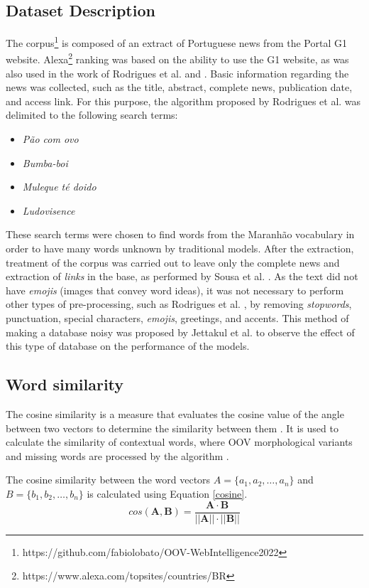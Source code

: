 \documentclass[conference]{IEEEtran}
\begin{document}
\subsection{Dataset Description}
The corpus\footnote[1]{https://github.com/fabiolobato/OOV-WebIntelligence2022} is composed of an extract of Portuguese news from the Portal G1 website. Alexa\footnote[2]{https://www.alexa.com/topsites/countries/BR} ranking was based on the ability to use the G1 website, as was also used in the work of Rodrigues et al. \cite{b11} and \cite{b28}. Basic information regarding the news was collected, such as the title, abstract, complete news, publication date, and access link. For this purpose, the algorithm proposed by Rodrigues et al. \cite{b11} was delimited to the following search terms:
\begin{itemize}
\item \textit{Pão com ovo}
\item \textit{Bumba-boi}
\item \textit{Muleque té doido}
\item \textit{Ludovisence}
\end{itemize}
These search terms were chosen to find words from the Maranhão vocabulary in order to have many words unknown by traditional models. After the extraction, treatment of the corpus was carried out to leave only the complete news and extraction of \textit{links} in the base, as performed by Sousa et al. \cite{b24}. As the text did not have \textit{emojis} (images that convey word ideas), it was not necessary to perform other types of pre-processing, such as Rodrigues et al. \cite{b11}, by removing \textit{stopwords}, punctuation, special characters, \textit{emojis}, greetings, and accents. This method of making a database noisy was proposed by Jettakul et al. \cite{b15} to observe the effect of this type of database on the performance of the models.

\subsection{Word similarity}
The cosine similarity is a measure that evaluates the cosine value of the angle between two vectors to determine the similarity between them \cite{b9}. It is used to calculate the similarity of contextual words, where OOV morphological variants and missing words are processed by the algorithm \cite{b8}.

The cosine similarity between the word vectors
\begin{math} 
A = \{a_1, a_2,\ldots,a_n\}
\end{math}
and 
\begin{math} 
B = \{b_1,b_2,\ldots,b_n\} 
\end{math}
is calculated using Equation \ref{cosine}.
\begin{equation}
\label{cosine}
cos(\pmb A, \pmb B) = \frac {\pmb A \cdot \pmb B}{||\pmb A|| \cdot ||\pmb B||}
\end{equation}
\end{document}
